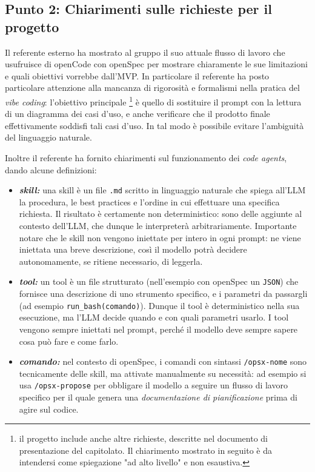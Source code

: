 \documentclass[a4paper, 11pt]{article}
\begin{document}
\subsection{Punto 2: Chiarimenti sulle richieste per il progetto}
Il referente esterno ha mostrato al gruppo il suo attuale flusso di lavoro che usufruisce di openCode con openSpec per mostrare chiaramente le sue limitazioni e quali obiettivi vorrebbe dall'MVP. In particolare il referente ha posto particolare attenzione alla mancanza di rigorosità e formalismi nella pratica del \textit{vibe coding}: l'obiettivo principale{\renewcommand{\thefootnote}{*} \footnote{il progetto include anche altre richieste, descritte nel documento di presentazione del capitolato. Il chiarimento mostrato in seguito è da intendersi come spiegazione "ad alto livello" e non esaustiva.}} è quello di sostituire il prompt con la lettura di un diagramma dei casi d'uso, e anche verificare che il prodotto finale effettivamente soddisfi tali casi d'uso. In tal modo è possibile evitare l'ambiguità del linguaggio naturale.

Inoltre il referente ha fornito chiarimenti sul funzionamento dei \textit{code agents}, dando alcune definizioni:
\begin{itemize}
    \item \textbf{\textit{skill:}} una skill è un file \texttt{.md} scritto in linguaggio naturale che spiega all'LLM la procedura, le best practices e l'ordine in cui effettuare una specifica richiesta. Il risultato è certamente non deterministico: sono delle aggiunte al contesto dell'LLM, che dunque le interpreterà arbitrariamente. Importante notare che le skill non vengono iniettate per intero in ogni prompt: ne viene iniettata una breve descrizione, così il modello potrà decidere autonomamente, se ritiene necessario, di leggerla.   \vspace{-0.2cm}
    \item \textbf{\textit{tool:}} un tool è un file strutturato (nell'esempio con openSpec un \texttt{JSON}) che fornisce una descrizione di uno strumento specifico, e i parametri da passargli (ad esempio \texttt{run\_bash(comando)}). Dunque il tool è deterministico nella sua esecuzione, ma l'LLM decide quando e con quali parametri usarlo. I tool vengono sempre iniettati nel prompt, perché il modello deve sempre sapere cosa può fare e come farlo. \vspace{-0.2cm}
    \item \textbf{\textit{comando:}} nel contesto di openSpec, i comandi con sintassi \texttt{/opsx-nome} sono tecnicamente delle skill, ma attivate manualmente su necessità: ad esempio si usa \texttt{/opsx-propose} per obbligare il modello a seguire un flusso di lavoro specifico per il quale genera una \textit{documentazione di pianificazione} prima di agire sul codice. \vspace{-0.2cm}
\end{itemize}
\end{document}
